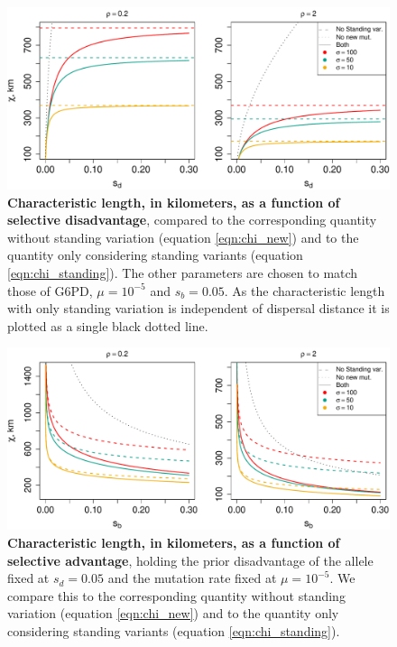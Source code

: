 \documentclass{article}
\begin{document}
\begin{figure}[ht]
\begin{center}
  \includegraphics[width=1.0\textwidth]{G6PD_charlengths}   %
\caption{ %
{\bf Characteristic length, in kilometers, as a function of selective disadvantage}, 
compared to the corresponding quantity without standing variation (equation \eqref{eqn:chi_new}) 
and to the quantity only considering standing variants (equation \eqref{eqn:chi_standing}).
The other parameters are chosen to match those of G6PD,
$\mu = 10^{-5}$ and $s_b = 0.05$. As the characteristic length with
only standing variation is independent of dispersal distance it is
plotted as a single black dotted line. 
} \label{Fig-G6PD-charlength}
\end{center}
\end{figure}

\begin{figure}[ht]
\begin{center}
  \includegraphics[width=1.0\textwidth]{G6PD_charlengths_sb}   %
\caption{ %
{\bf Characteristic length, in kilometers, as a function of selective advantage},
holding the prior disadvantage of the allele fixed at $s_d=0.05$ and the mutation rate fixed at $\mu=10^{-5}$.  
We compare this to the corresponding quantity without standing
variation (equation \eqref{eqn:chi_new}) 
and to the quantity only considering standing variants (equation \eqref{eqn:chi_standing}).
} \label{Fig-G6PD-charlength-sb}
\end{center}
\end{figure}
\end{document}
